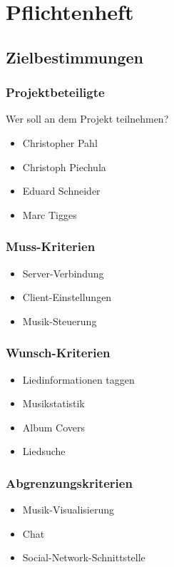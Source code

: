 \chapter{Pflichtenheft}
\section{Zielbestimmungen}
\subsection{Projektbeteiligte}
Wer soll an dem Projekt teilnehmen?
\begin{itemize}
        \item Christopher Pahl
        \item Christoph Piechula
        \item Eduard Schneider
        \item Marc Tigges
\end{itemize}
\subsection{Muss-Kriterien}
\renewcommand{\labelitemi}{•}
\begin{itemize}
	\item Server-Verbindung
	\item Client-Einstellungen
	\item Musik-Steuerung
\end{itemize}
\subsection{Wunsch-Kriterien}
\begin{itemize}
	\item Liedinformationen taggen
	\item Musikstatistik
	\item Album Covers
	\item Liedsuche
\end{itemize}
\subsection{Abgrenzungskriterien}
\begin{itemize}
	\item Musik-Visualisierung
	\item Chat
	\item Social-Network-Schnittstelle
\end{itemize}
